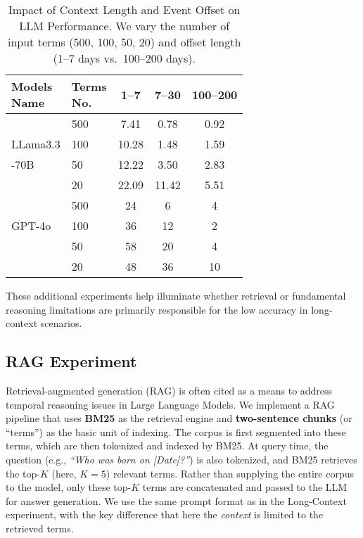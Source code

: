 \documentclass[11pt]{article}
\begin{document}
\begin{table}[ht]
\centering
\caption{Impact of Context Length and Event Offset on LLM Performance.
We vary the number of input terms (500, 100, 50, 20) and offset length (1--7 days vs.\ 100--200 days).}
\label{tab:results-long-context}
\begin{tabular}{l|l|ccc}
\hline
\parbox[t]{1cm}{\centering Models\\Name} & \parbox[t]{1cm}{\centering Terms\\No.} & \textbf{1--7} & \textbf{7--30} & \textbf{100--200} \\
\hline
         & 500 & 7.41 & 0.78 & 0.92 \\
LLama3.3 & 100 & 10.28 & 1.48 & 1.59 \\
-70B     & 50  & 12.22 & 3.50 & 2.83 \\
         & 20  & 22.09 & 11.42 & 5.51 \\
\hline
         & 500 & 24 & 6 & 4 \\
GPT-4o   & 100 & 36 & 12 & 2 \\
         & 50  & 58 & 20 & 4 \\
         & 20  & 48 & 36 & 10 \\
\hline
\end{tabular}
\end{table}

These additional experiments help illuminate whether retrieval or fundamental reasoning limitations are primarily responsible for the low accuracy in long-context scenarios.


\subsection{RAG Experiment}
Retrieval-augmented generation (RAG) is often cited as a means to address temporal reasoning issues in Large Language Models. We implement a RAG pipeline that uses \textbf{BM25} as the retrieval engine and \textbf{two-sentence chunks} (or “terms”) as the basic unit of indexing. The corpus is first segmented into these terms, which are then tokenized and indexed by BM25. At query time, the question (e.g., \emph{``Who was born on [Date]?''}) is also tokenized, and BM25 retrieves the top-$K$ (here, $K=5$) relevant terms. Rather than supplying the entire corpus to the model, only these top-$K$ terms are concatenated and passed to the LLM for answer generation. We use the same prompt format as in the Long-Context experiment, with the key difference that here the \emph{context} is limited to the retrieved terms.
\end{document}
